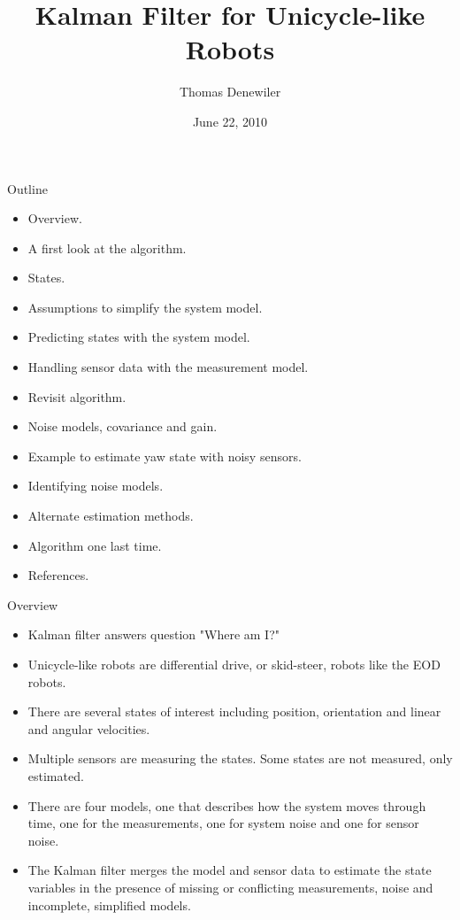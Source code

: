 \documentclass[hyperref={pdfpagelabels=false}]{beamer}
\title[Kalman Filter for Unicycle-like Robots]{Kalman Filter for Unicycle-like Robots}
\author{Thomas Denewiler}
\institute{SPAWAR}
\date{June 22, 2010}
\begin{document}
\def\argmin{\mathop{\arg\,\min}\limits}
\def\argmax{\mathop{\arg\,\max}\limits}

\begin{frame}
\titlepage
\end{frame}

\begin{frame}{Outline}
\begin{itemize}
\item Overview.
\item A first look at the algorithm.
\item States.
\item Assumptions to simplify the system model.
\item Predicting states with the system model.
\item Handling sensor data with the measurement model.
\item Revisit algorithm.
\item Noise models, covariance and gain.
\item Example to estimate yaw state with noisy sensors.
\item Identifying noise models.
\item Alternate estimation methods.
\item Algorithm one last time.
\item References.
\end{itemize}
\end{frame}

\begin{frame}{Overview}
\begin{itemize}
\item Kalman filter answers question "Where am I?"
\item Unicycle-like robots are differential drive, or skid-steer, robots like the EOD robots.
\item There are several states of interest including position, orientation and linear and angular velocities.
\item Multiple sensors are measuring the states. Some states are not measured, only estimated.
\item There are four models, one that describes how the system moves through time, one for the measurements, one for system noise and one for sensor noise.
\item The Kalman filter merges the model and sensor data to estimate the state variables in the presence of missing or conflicting measurements, noise and incomplete, simplified models.
\end{itemize}
\end{frame}
\end{document}
